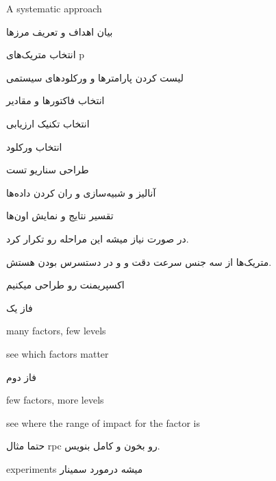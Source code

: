 A systematic approach

بیان اهداف و تعریف مرز‌ها

انتخاب متریک‌های p 

لیست کردن پارامتر‌ها و ورکلود‌های سیستمی

انتخاب فاکتور‌ها و مقادیر

انتخاب تکنیک ارزیابی

انتخاب ورکلود

طراحی سناریو تست

آنالیز و شبیه‌سازی و ران کردن داده‌ها

تقسیر نتایج و نمایش اون‌ها

در صورت نیاز میشه این مراحله رو تکرار کرد.

متریک‌ها از سه جنس سرعت دقت و و در دستسرس بودن هستش.

اکسپریمنت رو طراحی میکنیم

فاز یک

many factors, few levels

see which factors matter

فاز دوم

few factors, more levels

see where the range of impact for the factor is

حتما مثال rpc رو بخون و کامل بنویس.

experiments میشه درمورد سمینار
